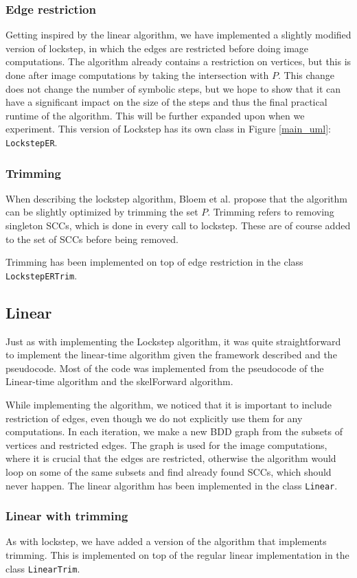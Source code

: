 \documentclass[../master/master.tex]{subfiles}
\begin{document}
\subsubsection{Edge restriction}
Getting inspired by the linear algorithm, we have implemented a slightly modified version of lockstep, in which the edges are restricted before doing image computations. The algorithm already contains a restriction on vertices, but this is done after image computations by taking the intersection with $P$. This change does not change the number of symbolic steps, but we hope to show that it can have a significant impact on the size of the steps and thus the final practical runtime of the algorithm. This will be further expanded upon when we experiment. This version of Lockstep has its own class in Figure \ref{main_uml}: \texttt{LockstepER}.

\subsubsection{Trimming}
When describing the lockstep algorithm\cite{lockstep}, Bloem et al. propose that the algorithm can be slightly optimized by trimming the set $P$. Trimming refers to removing singleton SCCs, which is done in every call to lockstep. These are of course added to the set of SCCs before being removed.

Trimming has been implemented on top of edge restriction in the class \texttt{LockstepERTrim}.

\subsection{Linear}
Just as with implementing the Lockstep algorithm, it was quite straightforward to implement the linear-time algorithm given the framework described and the pseudocode. Most of the code was implemented from the pseudocode of the Linear-time algorithm and the skelForward algorithm.

While implementing the algorithm, we noticed that it is important to include restriction of edges, even though we do not explicitly use them for any computations. In each iteration, we make a new BDD graph from the subsets of vertices and restricted edges. The graph is used for the image computations, where it is crucial that the edges are restricted, otherwise the algorithm would loop on some of the same subsets and find already found SCCs, which should never happen.
The linear algorithm has been implemented in the class \texttt{Linear}. 

\subsubsection{Linear with trimming}
As with lockstep, we have added a version of the algorithm that implements trimming. This is implemented on top of the regular linear implementation in the class \texttt{LinearTrim}.
\end{document}
